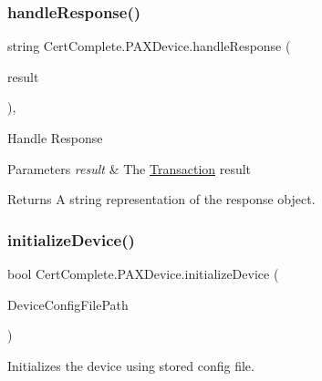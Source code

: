 \subsubsection{\texorpdfstring{handle\+Response()}{handleResponse()}}
{\footnotesize\ttfamily string Cert\+Complete.\+P\+A\+X\+Device.\+handle\+Response (\begin{DoxyParamCaption}\item[{P\+O\+S\+Link.\+Process\+Trans\+Result}]{result }\end{DoxyParamCaption})\hspace{0.3cm}{\ttfamily [inline]}, {\ttfamily [private]}}






\begin{DoxyEnumerate}
\item Handle Response 
\end{DoxyEnumerate}


\begin{DoxyParams}{Parameters}
{\em result} & The \mbox{\hyperlink{class_cert_complete_1_1_transaction}{Transaction}} result\\
\hline
\end{DoxyParams}
\begin{DoxyReturn}{Returns}
A string representation of the response object.
\end{DoxyReturn}
\mbox{\label{class_cert_complete_1_1_p_a_x_device_a3e48b4555be54f0e2a9c2b2434664cdf}} 
\subsubsection{\texorpdfstring{initialize\+Device()}{initializeDevice()}}
{\footnotesize\ttfamily bool Cert\+Complete.\+P\+A\+X\+Device.\+initialize\+Device (\begin{DoxyParamCaption}\item[{string}]{Device\+Config\+File\+Path }\end{DoxyParamCaption})\hspace{0.3cm}{\ttfamily [inline]}}



Initializes the device using stored config file. 


